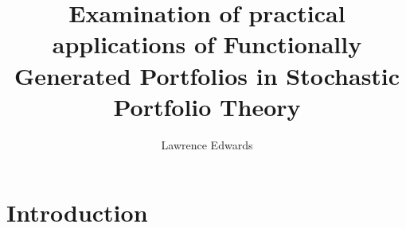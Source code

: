 \documentclass[british]{amsart}
\numberwithin{equation}{section}
\numberwithin{figure}{section}
\theoremstyle{plain}
\theoremstyle{definition}
\theoremstyle{plain}
\theoremstyle{plain}
\theoremstyle{plain}
\theoremstyle{remark}
\theoremstyle{plain}
\begin{document}
\title{Examination of practical applications of Functionally Generated 
Portfolios in Stochastic Portfolio Theory}
\author{Lawrence Edwards}
\maketitle

\tableofcontents{}

\section{Introduction}
% 
% 
% 
% 
% 
\end{document}
